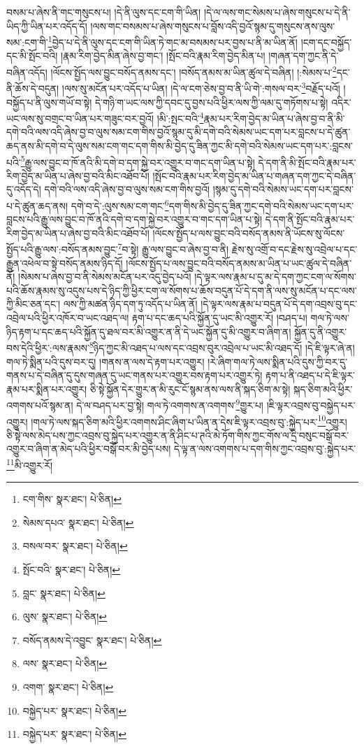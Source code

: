 བསམ་པ་ཞེས་ནི་གང་གསུངས་པ། །དེ་ནི་ལུས་དང་ངག་གི་ཡིན། །དེ་ལ་ལས་གང་སེམས་པ་ཞེས་གསུངས་པ་དེ་ནི་ཡིད་ཀྱི་ཡིན་པར་འདོད་དོ། །ལས་གང་བསམས་པ་ཞེས་གསུངས་པ་བློས་འདི་བྱའོ་སྙམ་དུ་གསུངས་ནས་ལུས་སམ་:ངག་གི་\footnote{ངག་གིས་  སྣར་ཐང་།  པེ་ཅིན། }བྱེད་པ་དེ་ནི་ལུས་དང་ངག་གི་ཡིན་ཏེ་གང་མ་བསམས་པར་བྱས་པ་ནི་མ་ཡིན་ནོ། །ངག་དང་བསྐྱོད་དང་མི་སྤོང་བའི། །རྣམ་རིག་བྱེད་མིན་ཞེས་བྱ་གང་། །སྤོང་བའི་རྣམ་རིག་བྱེད་མིན་པ། །གཞན་དག་ཀྱང་ནི་དེ་བཞིན་འདོད། །ལོངས་སྤྱོད་ལས་བྱུང་བསོད་ནམས་དང་། །བསོད་ནམས་མ་ཡིན་ཚུལ་དེ་བཞིན། །:སེམས་པ་\footnote{སེམས་དཔའ་  སྣར་ཐང་།  པེ་ཅིན། }དང་ནི་ཆོས་དེ་བདུན། །ལས་སུ་མངོན་པར་འདོད་པ་ཡིན། །དེ་ལ་ངག་ཅེས་བྱ་བ་ནི་ཡི་གེ་:གསལ་བར་\footnote{བསལ་བར་  སྣར་ཐང་།  པེ་ཅིན། }བརྗོད་པའོ། །བསྐྱོད་པ་ནི་ལུས་གཡོ་བ་སྟེ། དེ་གཉི་ག་ཡང་ལས་ཀྱི་དབང་དུ་བྱས་པའི་ཕྱིར་ལས་ཀྱི་ལམ་དུ་གཏོགས་པ་སྟེ། འདིར་ཡང་ལས་སུ་བགྲང་བ་ཡིན་པར་གཟུང་བར་བྱའོ། །མི་:སྤང་བའི་\footnote{སྤོང་བའི་  སྣར་ཐང་།  པེ་ཅིན། }རྣམ་པར་རིག་བྱེད་མ་ཡིན་པ་ཞེས་བྱ་བ་ནི་མི་དགེ་བའི་ལས་འདི་ཞེས་བྱ་བ་ལུས་སམ་ངག་གིས་བྱའོ་སྙམ་དུ་མི་དགེ་བའི་སེམས་ཡང་དག་པར་བླངས་པ་དེ་ཚུན་ཆད་ནས་མི་དགེ་བ་དེ་ལུས་སམ་ངག་གང་དག་གིས་མི་བྱེད་དུ་ཟིན་ཀྱང་མི་དགེ་བའི་སེམས་ཡང་དག་པར་:བླངས་པའི་\footnote{བླང་  སྣར་ཐང་།  པེ་ཅིན། }རྒྱུ་ལས་བྱུང་བ་ཁོ་ནའི་མི་དགེ་བ་དག་སྐྱེ་བར་འགྱུར་བ་གང་དག་ཡིན་པ་སྟེ། དེ་དག་ནི་མི་སྤོང་བའི་རྣམ་པར་རིག་བྱེད་མ་ཡིན་པ་ཞེས་བྱ་བའི་མིང་འཐོབ་པོ། །སྤོང་བའི་རྣམ་པར་རིག་བྱེད་མ་ཡིན་པ་གཞན་དག་ཀྱང་དེ་བཞིན་དུ་འདོད་དེ། དགེ་བའི་ལས་འདི་ཞེས་བྱ་བ་ལུས་སམ་ངག་གིས་བྱའོ། །སྙམ་དུ་དགེ་བའི་སེམས་ཡང་དག་པར་བླངས་པ་དེ་ཚུན་ཆད་ནས། དགེ་བ་དེ་:ལུས་སམ་ངག་གང་\footnote{ལུས་  སྣར་ཐང་།  པེ་ཅིན། }དག་གིས་མི་བྱེད་དུ་ཟིན་ཀྱང་དགེ་བའི་སེམས་ཡང་དག་པར་བླངས་པའི་རྒྱུ་ལས་བྱུང་བ་ཁོ་ནའི་དགེ་བ་དག་སྐྱེ་བར་འགྱུར་བ་གང་དག་ཡིན་པ་སྟེ། དེ་དག་ནི་སྤོང་བའི་རྣམ་པར་རིག་བྱེད་མ་ཡིན་པ་ཞེས་བྱ་བའི་མིང་འཐོབ་པོ། །ལོངས་སྤྱོད་པ་ལས་བྱུང་བའི་བསོད་ནམས་ནི་ཡོངས་སུ་ལོངས་སྤྱོད་པའི་རྒྱུ་ལས་:བསོད་ནམས་བྱུང་\footnote{བསོད་ནམས་དེ་འབྱུང་  སྣར་ཐང་།  པེ་ཅིན། }བ་སྟེ། རྒྱུ་ལས་བྱུང་བ་ཞེས་བྱ་བ་ནི། རྗེས་སུ་འགྲོ་བ་དང་རྗེས་སུ་འབྲེལ་པ་དང་རྒྱུན་འཕེལ་བ་སྟེ་བསོད་ནམས་ཉིད་དོ། །ལོངས་སྤྱོད་པ་ལས་བྱུང་བའི་བསོད་ནམས་མ་ཡིན་པ་ཡང་ཚུལ་དེ་བཞིན་ནོ། །སེམས་པ་ཞེས་བྱ་བ་ནི་སེམས་མངོན་པར་འདུ་བྱེད་པའོ། །དེ་ལྟར་ལས་རྣམ་པ་དུ་མ་དེ་དག་ཀྱང་ངག་ལ་སོགས་པའི་ཆོས་རྣམས་སུ་འདུས་པས་དེ་ཉིད་ཀྱི་ཕྱིར་ངག་ལ་སོགས་པ་ཆོས་བདུན་པོ་དེ་དག་ནི་ལས་སུ་མངོན་པ་དང་ལས་ཀྱི་མིང་ཅན་དང་། ལས་ཀྱི་མཚན་ཉིད་དག་ཏུ་འདོད་པ་ཡིན་ནོ། །དེ་ལྟར་ལས་རྣམ་པ་བདུན་པོ་དེ་དག་འབྲས་བུ་དང་འབྲེལ་པའི་ཕྱིར་འཁོར་བ་ཡང་འཐད་ལ། རྟག་པ་དང་ཆད་པའི་སྐྱོན་དུ་ཡང་མི་འགྱུར་རོ། །བཤད་པ། གལ་ཏེ་ལས་ཉིད་རྟག་པ་དང་ཆད་པའི་སྐྱོན་དུ་ཐལ་བར་མི་འགྱུར་ན་ནི་དེ་ཡང་སྐྱོན་དུ་མི་འགྱུར་བ་ཞིག་ན། སྐྱོན་དུ་ནི་འགྱུར་བས་དེའི་ཕྱིར་:ལས་རྣམས་\footnote{ལས་  སྣར་ཐང་།  པེ་ཅིན། }ཉིད་ཀྱང་མི་འཐད་པ་ལས་དང་འབྲས་བུར་འབྲེལ་པ་ཡང་མི་འཐད་དོ། །དེ་ཇི་ལྟར་ཞེ་ན། གལ་ཏེ་སྨིན་པའི་དུས་བར་དུ། །གནས་ན་ལས་དེ་རྟག་པར་འགྱུར། །རེ་ཞིག་གལ་ཏེ་ལས་སྨིན་པའི་དུས་ཀྱི་བར་དུ་གནས་པ་དེ་བཞིན་དུ་དུས་གཞན་དུ་ཡང་གནས་པར་འགྱུར་བས་རྟག་པར་འགྱུར་ཏེ། རྟག་པ་ནི་འཐད་པ་དེ་ཇི་ལྟར་རྣམ་པར་སྨིན་པར་འགྱུར། ཅི་སྟེ་སྐྱོན་དེར་གྱུར་ན་མི་རུང་ངོ་སྙམ་ནས་ལས་ནི་སྐད་ཅིག་མ་སྟེ། སྐད་ཅིག་མའི་ཕྱིར་འགགས་པའོ་སྙམ་ན། དེ་ལ་བཤད་པར་བྱ་སྟེ། གལ་ཏེ་འགགས་ན་འགགས་\footnote{འགག་  སྣར་ཐང་།  པེ་ཅིན། }གྱུར་པ། །ཇི་ལྟར་འབྲས་བུ་བསྐྱེད་པར་འགྱུར། །གལ་ཏེ་ལས་སྐད་ཅིག་མའི་ཕྱིར་འགགས་ཤིང་ཞིག་པ་ཡིན་ན་དེས་ཇི་ལྟར་འབྲས་བུ་:སྐྱེད་པར་\footnote{བསྐྱེད་པར་  སྣར་ཐང་།  པེ་ཅིན། }འགྱུར། ཅི་སྟེ་ལས་མེད་པས་ཀྱང་འབྲས་བུ་སྐྱེད་པར་འགྱུར་ན་ནི་ཤིང་པ་ཊའི་མེ་ཏོག་གིས་ཀྱང་གོས་ལ་དྲི་བསུང་བསྒོ་བར་འགྱུར་བ་ཞིག་ན་མེད་པའི་ཕྱིར་བསྒོ་བར་མི་བྱེད་པས། དེ་ལྟ་ན་ལས་འགགས་པ་དག་གིས་ཀྱང་འབྲས་བུ་:སྐྱེད་པར་\footnote{བསྐྱེད་པར་  སྣར་ཐང་།  པེ་ཅིན། }མི་འགྱུར་རོ། 